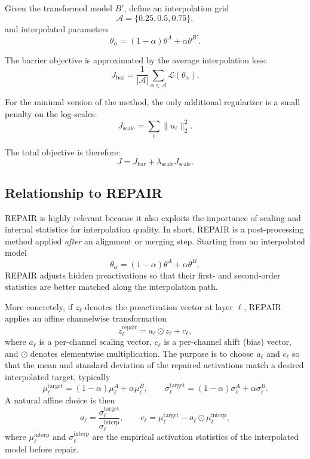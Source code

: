 \documentclass[11pt,a4paper]{article}
\begin{document}
Given the transformed model \(B'\), define an interpolation grid
\[
\mathcal{A} = \{0.25, 0.5, 0.75\},
\]
and interpolated parameters
\[
\theta_\alpha = (1-\alpha)\theta^A + \alpha \theta^{B'}.
\]

The barrier objective is approximated by the average interpolation loss:
\[
J_{\mathrm{bar}} =
\frac{1}{|\mathcal{A}|}
\sum_{\alpha \in \mathcal{A}}
\mathcal{L}(\theta_\alpha).
\]

For the minimal version of the method, the only additional regularizer is a small penalty on the log-scales:
\[
J_{\mathrm{scale}} =
\sum_{\ell} \|u_\ell\|_2^2.
\]

The total objective is therefore:
\[
J = J_{\mathrm{bar}} + \lambda_{\mathrm{scale}} J_{\mathrm{scale}}.
\]


\subsection{Relationship to REPAIR}

REPAIR is highly relevant because it also exploits the importance of scaling and internal statistics for interpolation quality. In short, REPAIR is a post-processing method applied \emph{after} an alignment or merging step. Starting from an interpolated model
\[
\theta_\alpha = (1-\alpha)\theta^A + \alpha \theta^B,
\]
REPAIR adjusts hidden preactivations so that their first- and second-order statistics are better matched along the interpolation path.

More concretely, if \(z_\ell\) denotes the preactivation vector at layer \(\ell\), REPAIR applies an affine channelwise transformation
\[
z_\ell^{\mathrm{repair}} = a_\ell \odot z_\ell + c_\ell,
\]
where \(a_\ell\) is a per-channel scaling vector, \(c_\ell\) is a per-channel shift (bias) vector, and \(\odot\) denotes elementwise multiplication. The purpose is to choose \(a_\ell\) and \(c_\ell\) so that the mean and standard deviation of the repaired activations match a desired interpolated target, typically
\[
\mu_\ell^{\mathrm{target}} = (1-\alpha)\mu_\ell^A + \alpha \mu_\ell^B,
\qquad
\sigma_\ell^{\mathrm{target}} = (1-\alpha)\sigma_\ell^A + \alpha \sigma_\ell^B.
\]
A natural affine choice is then
\[
a_\ell = \frac{\sigma_\ell^{\mathrm{target}}}{\sigma_\ell^{\mathrm{interp}}},
\qquad
c_\ell = \mu_\ell^{\mathrm{target}} - a_\ell \odot \mu_\ell^{\mathrm{interp}},
\]
where \(\mu_\ell^{\mathrm{interp}}\) and \(\sigma_\ell^{\mathrm{interp}}\) are the empirical activation statistics of the interpolated model before repair.
\end{document}
